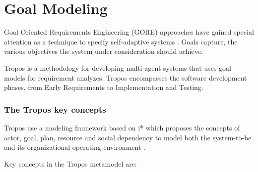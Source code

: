 \section{Goal Modeling}
Goal Oriented Requirements Engineering (GORE) approaches have gained special attention as a technique to specify self-adaptive systems \cite{morandini_goal-oriented_2009}.
Goals capture, the various objectives the system under consideration should achieve.

Tropos\cite{bresciani_tropos:_2004} is a methodology for developing multi-agent systems that uses goal models for requirement analyzes. Tropos encompasses the software development phases, from Early Requirements to Implementation and Testing.

\subsubsection{The Tropos key concepts}

Tropos use a modeling framework based on i* \cite{yu_modelling_1996} which proposes the concepts of actor, goal, plan, resource and social dependency to model both the system-to-be and its organizational operating environment \cite{bresciani_tropos:_2004} \cite{morandini_tropos_2014}.

Key concepts in the Tropos metamodel are:

